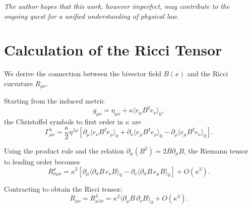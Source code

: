 \documentclass[11pt,a4paper]{article}
\numberwithin{equation}{section}
\theoremstyle{plain}
\theoremstyle{definition}
\theoremstyle{remark}
\newif\ifack
\begin{document}
\medskip
\noindent\textit{The author hopes that this work, however imperfect, may contribute to the ongoing quest for a unified understanding of physical law.}

\ifack
\section*{Acknowledgements}
The author is indebted to the pioneering work of David Hestenes and colleagues in developing geometric algebra as a language for physics. Discussions with Anthony Lasenby and Chris Doran on gauge theory gravity were invaluable. Thanks are due to the LIGO and Virgo collaborations for making gravitational wave data publicly available. This work was conducted independently without external funding.
\fi

\appendix
\section{Calculation of the Ricci Tensor}
\label{app:ricci}

We derive the connection between the bivector field $B(x)$ and the Ricci curvature $R_{\mu\nu}$.

Starting from the induced metric
\begin{equation}
g_{\mu\nu} = \eta_{\mu\nu} + \kappa \langle e_\mu B^2 e_\nu \rangle_0,
\end{equation}
the Christoffel symbols to first order in $\kappa$ are
\begin{equation}
\Gamma^\lambda_{\mu\nu} = \frac{\kappa}{2} \eta^{\lambda\rho} \left[\partial_\mu \langle e_\nu B^2 e_\rho \rangle_0 + \partial_\nu \langle e_\mu B^2 e_\rho \rangle_0 - \partial_\rho \langle e_\mu B^2 e_\nu \rangle_0\right].
\end{equation}

Using the product rule and the relation $\partial_\mu (B^2) = 2 B \partial_\mu B$, the Riemann tensor to leading order becomes
\begin{equation}
R^\rho_{\sigma\mu\nu} = \kappa^2 \left[\partial_\mu \langle \partial_\sigma B \, e_\nu B \rangle_0 - \partial_\nu \langle \partial_\sigma B \, e_\mu B \rangle_0\right] + O(\kappa^3).
\end{equation}

Contracting to obtain the Ricci tensor:
\begin{equation}
R_{\mu\nu} = R^\lambda_{\mu\lambda\nu} = \kappa^2 \langle \partial_\mu B \, \partial_\nu B \rangle_0 + O(\kappa^3).
\end{equation}
\end{document}
